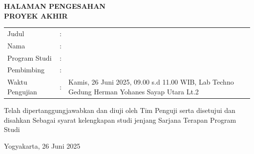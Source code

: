 \newpage
\begin{center}
        \textbf{\large \MakeUppercase{HALAMAN PENGESAHAN\\ \normalsize PROYEK AKHIR}}
\end{center}

\begin{table}[H]
	\begin{tabular}{p{4cm} p{0.5cm} p{10cm}}
		Judul  & : & \judulyud  \\
		Nama   & : & \penulis  \\
		Program Studi   & : &\prodi  \\
		Pembimbing   & : & \pembimbing  \\
		Waktu Pengujian   & : & Kamis, 26 Juni 2025, 09.00 s.d 11.00 WIB, Lab Techno Gedung Herman Yohanes Sayap Utara Lt.2 \\
	\end{tabular}
\end{table}

\begin{center}
    Telah dipertanggungjawabkan dan diuji oleh Tim Penguji serta disetujui dan disahkan Sebagai syarat kelengkapan studi jenjang Sarjana Terapan Program Studi {\prodi} {\fakultas} {\universitas}\\
\end{center}

\begin{center}
    Yogyakarta, 26 Juni 2025
\end{center}

